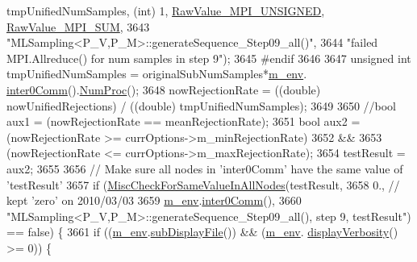 \begin{DoxyCode}
      tmpUnifiedNumSamples, (\textcolor{keywordtype}{int}) 1, \hyperlink{_mpi_comm_8h_a06cbfbc33436f6e0dc8a48ff3c49bdfc}{RawValue\_MPI\_UNSIGNED}, 
      \hyperlink{_mpi_comm_8h_afbf78d291c032aa7f512bc566cee2bd1}{RawValue\_MPI\_SUM},
3643                                        \textcolor{stringliteral}{"MLSampling<P\_V,P\_M>::generateSequence\_Step09\_all()"},
3644                                        \textcolor{stringliteral}{"failed MPI.Allreduce() for num samples in step 9"});
3645 \textcolor{preprocessor}{#endif}
3646 \textcolor{preprocessor}{}
3647           \textcolor{keywordtype}{unsigned} \textcolor{keywordtype}{int} tmpUnifiedNumSamples = originalSubNumSamples*\hyperlink{class_q_u_e_s_o_1_1_m_l_sampling_a13f1ca4fe9f94822fe572a743eaced1d}{m\_env}.
      \hyperlink{class_q_u_e_s_o_1_1_base_environment_a689e4d140c74d495d97eb498714a4b82}{inter0Comm}().\hyperlink{class_q_u_e_s_o_1_1_mpi_comm_aa780721ae0fdeabc5a15e04cb0cad964}{NumProc}();
3648           nowRejectionRate = ((double) nowUnifiedRejections) / ((double) tmpUnifiedNumSamples);
3649 
3650           \textcolor{comment}{//bool aux1 = (nowRejectionRate == meanRejectionRate);}
3651           \textcolor{keywordtype}{bool} aux2 = (nowRejectionRate >= currOptions->m\_minRejectionRate)
3652                       &&
3653                       (nowRejectionRate <= currOptions->m\_maxRejectionRate);
3654           testResult = aux2;
3655 
3656           \textcolor{comment}{// Make sure all nodes in 'inter0Comm' have the same value of 'testResult'}
3657           \textcolor{keywordflow}{if} (\hyperlink{namespace_q_u_e_s_o_a4166a375c5adbea35afaaf20775bc519}{MiscCheckForSameValueInAllNodes}(testResult,
3658                                                 0., \textcolor{comment}{// kept 'zero' on 2010/03/03}
3659                                                 \hyperlink{class_q_u_e_s_o_1_1_m_l_sampling_a13f1ca4fe9f94822fe572a743eaced1d}{m\_env}.\hyperlink{class_q_u_e_s_o_1_1_base_environment_a689e4d140c74d495d97eb498714a4b82}{inter0Comm}(),
3660                                                 \textcolor{stringliteral}{"MLSampling<P\_V,P\_M>::generateSequence\_Step09\_all(), step
       9, testResult"}) == \textcolor{keyword}{false}) \{
3661             \textcolor{keywordflow}{if} ((\hyperlink{class_q_u_e_s_o_1_1_m_l_sampling_a13f1ca4fe9f94822fe572a743eaced1d}{m\_env}.\hyperlink{class_q_u_e_s_o_1_1_base_environment_a8a0064746ae8dddfece4229b9ad374d6}{subDisplayFile}()) && (\hyperlink{class_q_u_e_s_o_1_1_m_l_sampling_a13f1ca4fe9f94822fe572a743eaced1d}{m\_env}.
      \hyperlink{class_q_u_e_s_o_1_1_base_environment_a1fe5f244fc0316a0ab3e37463f108b96}{displayVerbosity}() >= 0)) \{

\end{DoxyCode}
